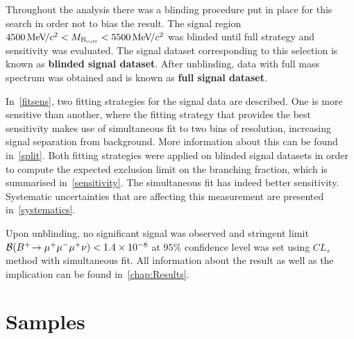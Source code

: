 Throughout the analysis there was a blinding procedure put in place for this search in order not to bias the result. The signal region $4500{{\mathrm{\,Me\kern -0.1em V\!/}c^2}}<M_{\rm{B_{corr}}}<{5500{\mathrm{\,Me\kern -0.1em V\!/}c^2}}$ was blinded until full strategy and sensitivity was evaluated. The signal dataset corresponding to this selection is known as \textbf{blinded signal dataset}. After unblinding, data with full mass spectrum was obtained and is known as \textbf{full signal dataset}.%



In~\autoref{fitsens}, two fitting strategies for the signal data are described. One is more sensitive than another, where the fitting strategy that provides the best sensitivity makes use of simultaneous fit to two bins of resolution, increasing signal separation from background. More information about this can be found in~\autoref{split}. Both fitting strategies were applied on blinded signal datasets in order to compute the expected exclusion limit on the branching fraction, which is summarised in~\autoref{sensitivity}. The simultaneous fit has indeed better sensitivity. Systematic uncertainties that are affecting this measurement are presented in~\autoref{systematics}.


Upon unblinding, no significant signal was observed and stringent limit $\mathcal{B}({{{B}^+}}\!\rightarrow {\ensuremath{\mu^+\mu^-\mu^+}}\nu) < 1.4\times 10^{-8}$ at $95\%$ confidence level was set using $CL_{s}$ method with simultaneous fit. All information about the result as well as the implication can be found in~\autoref{chap:Results}.%









\section{Samples}
\label{samples}

